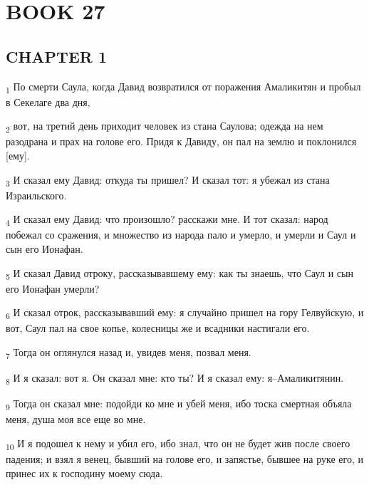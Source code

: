 \section{BOOK 27}
\subsection{CHAPTER 1}
\begin{tcolorbox}
\textsubscript{1} По смерти Саула, когда Давид возвратился от поражения Амаликитян и пробыл в Секелаге два дня,
\end{tcolorbox}
\begin{tcolorbox}
\textsubscript{2} вот, на третий день приходит человек из стана Саулова; одежда на нем разодрана и прах на голове его. Придя к Давиду, он пал на землю и поклонился [ему].
\end{tcolorbox}
\begin{tcolorbox}
\textsubscript{3} И сказал ему Давид: откуда ты пришел? И сказал тот: я убежал из стана Израильского.
\end{tcolorbox}
\begin{tcolorbox}
\textsubscript{4} И сказал ему Давид: что произошло? расскажи мне. И тот сказал: народ побежал со сражения, и множество из народа пало и умерло, и умерли и Саул и сын его Ионафан.
\end{tcolorbox}
\begin{tcolorbox}
\textsubscript{5} И сказал Давид отроку, рассказывавшему ему: как ты знаешь, что Саул и сын его Ионафан умерли?
\end{tcolorbox}
\begin{tcolorbox}
\textsubscript{6} И сказал отрок, рассказывавший ему: я случайно пришел на гору Гелвуйскую, и вот, Саул пал на свое копье, колесницы же и всадники настигали его.
\end{tcolorbox}
\begin{tcolorbox}
\textsubscript{7} Тогда он оглянулся назад и, увидев меня, позвал меня.
\end{tcolorbox}
\begin{tcolorbox}
\textsubscript{8} И я сказал: вот я. Он сказал мне: кто ты? И я сказал ему: я--Амаликитянин.
\end{tcolorbox}
\begin{tcolorbox}
\textsubscript{9} Тогда он сказал мне: подойди ко мне и убей меня, ибо тоска смертная объяла меня, душа моя все еще во мне.
\end{tcolorbox}
\begin{tcolorbox}
\textsubscript{10} И я подошел к нему и убил его, ибо знал, что он не будет жив после своего падения; и взял я венец, бывший на голове его, и запястье, бывшее на руке его, и принес их к господину моему сюда.
\end{tcolorbox}
